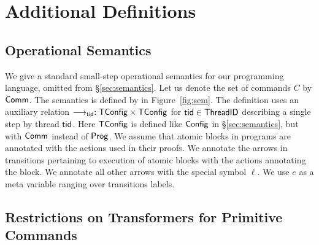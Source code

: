 

\section{Additional Definitions\label{app:formal}}

\subsection{Operational Semantics}

We give a standard small-step operational semantics for our programming
language, omitted from \S\ref{sec:semantics}. Let us denote the set of commands
$C$ by ${\sf Comm}$.  The semantics is defined by in Figure~\ref{fig:sem}. The
definition uses an auxiliary relation $\longrightarrow_{{\sf tid}} : {\sf TConfig} \times
{\sf TConfig}$ for ${\sf tid}\in{\sf ThreadID}$ describing a single step by thread
${\sf tid}$. Here ${\sf TConfig}$ is defined like ${\sf Config}$ in
\S\ref{sec:semantics}, but with ${\sf Comm}$ instead of ${\sf Prog}$.
We assume that atomic blocks in programs are annotated with the actions  used in their proofs. 
We annotate the arrows in transitions   pertaining to execution of atomic blocks with the actions annotating the block.
We annotate all other arrows with the special symbol $\ell$. 
We use $e$ as a meta variable ranging over transitions labels.


\subsection{Restrictions on Transformers for Primitive
  Commands}\label{sec:pcomm} 

